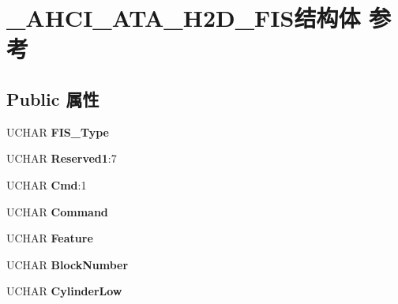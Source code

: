\hypertarget{struct___a_h_c_i___a_t_a___h2_d___f_i_s}{}\section{\+\_\+\+A\+H\+C\+I\+\_\+\+A\+T\+A\+\_\+\+H2\+D\+\_\+\+F\+I\+S结构体 参考}
\label{struct___a_h_c_i___a_t_a___h2_d___f_i_s}
\subsection*{Public 属性}
\begin{DoxyCompactItemize}
\item 
\mbox{\label{struct___a_h_c_i___a_t_a___h2_d___f_i_s_aead0f5483812982a6729aa557fc5fac4}} 
U\+C\+H\+AR {\bfseries F\+I\+S\+\_\+\+Type}
\item 
\mbox{\label{struct___a_h_c_i___a_t_a___h2_d___f_i_s_adc3e74709669549d056d57188b918de2}} 
U\+C\+H\+AR {\bfseries Reserved1}\+:7
\item 
\mbox{\label{struct___a_h_c_i___a_t_a___h2_d___f_i_s_af9bed89a1b7f8d1be647b9518d09cde9}} 
U\+C\+H\+AR {\bfseries Cmd}\+:1
\item 
\mbox{\label{struct___a_h_c_i___a_t_a___h2_d___f_i_s_af824f5e51864e75470cd806daa45bb0c}} 
U\+C\+H\+AR {\bfseries Command}
\item 
\mbox{\label{struct___a_h_c_i___a_t_a___h2_d___f_i_s_ac1290e61192edc9a2d7ae6932ae5120e}} 
U\+C\+H\+AR {\bfseries Feature}
\item 
\mbox{\label{struct___a_h_c_i___a_t_a___h2_d___f_i_s_a554064e93dff510ee324ad7b61271b32}} 
U\+C\+H\+AR {\bfseries Block\+Number}
\item 
\mbox{\label{struct___a_h_c_i___a_t_a___h2_d___f_i_s_a1ba3c04198010794dbc798d0807d4f60}} 
U\+C\+H\+AR {\bfseries Cylinder\+Low}
\item 
\mbox{\label{struct___a_h_c_i___a_t_a___h2_d___f_i_s_a2356a539426038c6cf30da3ed53d5409}} 

\end{DoxyCompactItemize}

